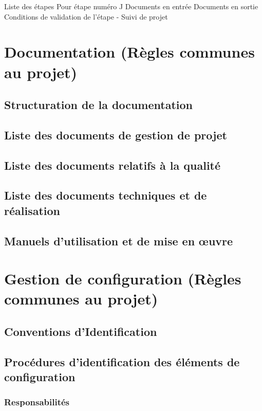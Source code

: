 \documentclass[a4paper]{article}
\begin{document}
Liste des étapes
Pour étape numéro J
Documents en entrée
Documents en sortie
Conditions de validation de l'étape
      -     Suivi de projet

\section{Documentation (Règles communes au projet)}

\subsection{Structuration de la documentation}

\subsection{Liste des documents de gestion de projet}

\subsection{Liste des documents relatifs à la qualité}

\subsection{Liste des documents techniques et de réalisation}

\subsection{Manuels d'utilisation et de mise en œuvre}

\section{Gestion de configuration (Règles communes au projet)}

\subsection{Conventions d'Identification}

\subsection{Procédures d'identification des éléments de configuration }

\subsubsection{Responsabilités}
\end{document}

